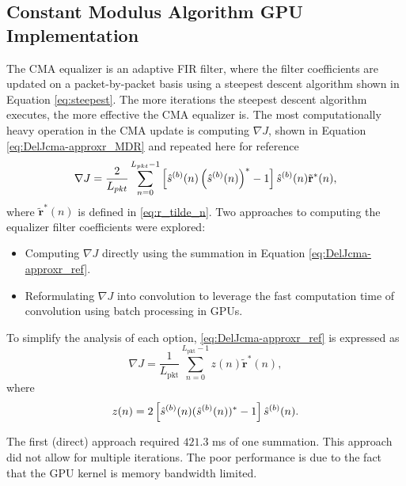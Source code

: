 \subsection{Constant Modulus Algorithm GPU Implementation}
The CMA equalizer is an adaptive FIR filter, where the filter coefficients are updated on a packet-by-packet basis using a steepest descent algorithm shown in Equation \eqref{eq:steepest}.
The more iterations the steepest descent algorithm executes, the more effective the CMA equalizer is.
The most computationally heavy operation in the CMA update is computing $\nabla J$, shown in Equation \eqref{eq:DelJcma-approxr_MDR} and repeated here for reference
\begin{equation}
	\nabla J = \frac{2}{L_{pkt}} \sum_{n=0}^{L_{pkt}-1}
	\left[ \vphantom{\displaystyle\sum}  \hat{s}^{(b)}(n) \left( \hat{s}^{(b)}(n)\right)^\ast - 1 \right]
	\hat{s}^{(b)}(n)  \tilde{\mathbf{r}}^\ast(n),
\label{eq:DelJcma-approxr_ref}
\end{equation}
where $\tilde{\mathbf{r}}^\ast(n)$ is defined in \eqref{eq:r_tilde_n}.
Two approaches to computing the equalizer filter coefficients were explored:
\begin{itemize}
\item Computing $\nabla J$ directly using the summation in Equation \eqref{eq:DelJcma-approxr_ref}.
\item Reformulating $\nabla J$ into convolution to leverage the fast computation time of convolution using batch processing in GPUs.
\end{itemize}
To simplify the analysis of each option, \eqref{eq:DelJcma-approxr_ref} is expressed as
\begin{equation}
	\nabla J = \frac{1}{L_\text{pkt}} \sum_{n=0}^{L_\text{pkt}-1}
	z(n)  \tilde{\mathbf{r}}^\ast(n),
	\label{eq:CMA_challenge_ref}
\end{equation}
where
\begin{equation}
z(n) = 	2\left[ \vphantom{\displaystyle\sum}  \hat{s}^{(b)}(n) (\hat{s}^{(b)}(n))^\ast - 1 \right] \hat{s}^{(b)}(n).
\end{equation}

The first (direct) approach required $421.3$ ms of one summation.
This approach did not allow for multiple iterations.
The poor performance is due to the fact that the GPU kernel is memory bandwidth limited.


